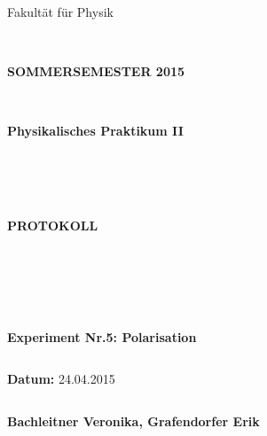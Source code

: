 \documentclass[twoside]{article}
\begin{document}
\thispagestyle{empty}
			\begin{center}
			\Large{Fakultät für Physik}\\
			\end{center}
\begin{verbatim}


\end{verbatim}
			\begin{center}
			\textbf{\LARGE SOMMERSEMESTER 2015}
			\end{center}
\begin{verbatim}


\end{verbatim}
			\begin{center}
			\textbf{\LARGE{Physikalisches Praktikum II}}
			\end{center}
\begin{verbatim}




\end{verbatim}

			\begin{center}
			\textbf{\LARGE{PROTOKOLL}}
			\end{center}
			
\begin{verbatim}





\end{verbatim}

			\begin{flushleft}
			\textbf{\Large{Experiment Nr.5: Polarisation}}\\
			\LARGE{}	
			\end{flushleft}

\begin{verbatim}

\end{verbatim}	
			\begin{flushleft}
			\textbf{\Large{Datum:}} \Large{24.04.2015}
			\end{flushleft}
			
\begin{verbatim}
\end{verbatim}
		\begin{flushleft}
			\textbf{\Large{Bachleitner Veronika, Grafendorfer Erik}} 
			\end{flushleft}
\end{document}
